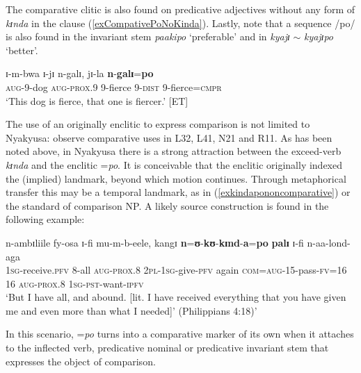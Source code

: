 The comparative clitic is also found on predicative adjectives without any form of \textit{kɪnda} in the clause (\ref{exCompativePoNoKinda}). Lastly, note that a sequence /po/ is also found in the invariant stem \textit{paakipo} \lq preferable' and in \textit{kyajɪ} $\sim$ \textit{kyajɪpo} \lq better'.

\begin{exe}
	\ex \label{exCompativePoNoKinda}\gll ɪ-m-bwa ɪ-jɪ n-galɪ, jɪ-la \textbf{n}-\textbf{galɪ}=\textbf{po}\\
	\textsc{aug}-9-dog \textsc{aug}-\textsc{prox.9} 9-fierce 9-\textsc{dist} 9-fierce=\textsc{cmpr}\\
	\glt \lq This dog is fierce, that one is fiercer.' [ET]
\end{exe}

The use of an originally  enclitic to express comparison is not limited to Nyakyusa: \citet{DevosMPersohnB2017} observe comparative uses in  L32,  L41,  N21 and  R11. As has been noted above, in Nyakyusa there is a strong attraction between the exceed-verb \textit{kɪnda} and the enclitic \mbox{=\textit{po}}. It is conceivable that the enclitic originally indexed the (implied) landmark, beyond which motion continues. Through metaphorical transfer this may be a temporal landmark, as in (\ref{exkindapononcomparative}) or the standard of comparison NP. A likely source construction is found in the following example:

\begin{exe}
	\ex \gll n-ambɪliile fy-osa ɪ-fi mu-m-b-eele, kangɪ \textbf{n}=\textbf{ʊ}-\textbf{kʊ}-\textbf{kɪnd}-\textbf{a}=\textbf{po} \textbf{palɪ} ɪ-fi n-aa-lond-aga\\
	\textsc{1sg}-receive.\textsc{pfv} 8-all \textsc{aug}-\textsc{prox.8} \textsc{2pl}-\textsc{1sg}-give-\textsc{pfv} again \textsc{com}=\textsc{aug}-15-pass-\textsc{fv}=\textsc{16} 16 \textsc{aug}-\textsc{prox.8} \textsc{1sg}-\textsc{pst}-want-\textsc{ipfv}\\
	\glt \lq But I have all, and abound. [lit. I have received everything that you have given me and even more than what I needed]’ (Philippians 4:18)'
\end{exe}

In this scenario, \mbox{=\textit{po}} turns into a comparative marker of its own when it attaches to the inflected verb, predicative nominal or predicative invariant stem that expresses the object of comparison.
